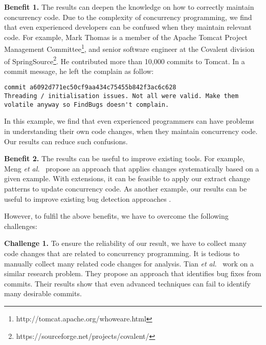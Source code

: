\noindent
\textbf{Benefit 1.} The results can deepen the knowledge on how to correctly maintain concurrency code. Due to the complexity of concurrency programming, we find that even experienced developers can be confused when they maintain relevant code. For example, Mark Thomas is a member of the Apache Tomcat Project Management Committee\footnote{http://tomcat.apache.org/whoweare.html}, and senior software engineer at the Covalent division of SpringSource\footnote{https://sourceforge.net/projects/covalent/}. He contributed more than 10,000 commits to Tomcat. In a commit message, he left the complain as follow:

\lstset{numbers=left, breaklines=true,  basicstyle=\ttfamily\tiny,  xleftmargin=3em, tabsize=2}
\begin{lstlisting}
commit a6092d771ec50cf9aa434c75455b842f3ac6c628
Threading / initialisation issues. Not all were valid. Make them volatile anyway so FindBugs doesn't complain.
\end{lstlisting}

\noindent
In this example, we find that even experienced programmers can have problems in understanding their own code changes, when they maintain concurrency code. Our results can reduce such confusions.


\noindent
\textbf{Benefit 2.} The results can be useful to improve existing tools. For example, Meng \emph{et al.}~\cite{conf/pldi/MengKM11} propose an approach that applies changes systematically based on a given example. With extensions, it can be feasible to apply our extract change patterns to update concurrency code. As another example, our results can be useful to improve existing bug detection approaches \cite{conf/ppopp/SamakR14, conf/sigsoft/EslamimehrP14}.

However, to fulfil the above benefits, we have to overcome the following challenges:

\noindent
\textbf{Challenge 1.} To ensure the reliability of our result, we have to collect many code changes that are related to concurrency programming. It is tedious to manually collect many related code changes for analysis. Tian \emph{et al.}~\cite{tian2012identifying} work on a similar research problem. They propose an approach that identifies bug fixes from commits. Their results show that even advanced techniques can fail to identify many desirable commits.


